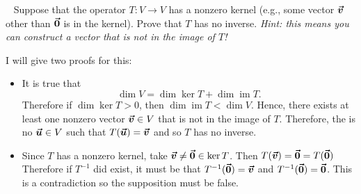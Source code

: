 \documentclass[12pt]{article} %
\newcommand{\image}{\operatorname{im}}
\begin{document}
\newpage
\begin{problem}~
    Suppose that the operator $T\colon V \to V$ has a nonzero kernel (e.g., some vector $\boldsymbol{\vec{v}}$ other than $\boldsymbol{\vec{0}}$ is in the kernel). Prove that $T$ has no inverse. \emph{Hint: this means you can construct a vector that is not in the image of $T$!}
\end{problem}
\begin{solution}
I will give two proofs for this:
\begin{itemize}
\item It is true that
\[
\dim V = \dim \ker T + \dim \image T.
\]
Therefore if $\dim \ker T >0$, then $\dim \image T < \dim V$. Hence, there exists at least one nonzero vector $\boldsymbol{\vec{v}} \in V$ that is not in the image of $T$. Therefore, the is no $\boldsymbol{\vec{u}} \in V$ such that $T(\boldsymbol{\vec{u}})=\boldsymbol{\vec{v}}$ and so $T$ has no inverse.
\item Since $T$ has a nonzero kernel, take $\boldsymbol{\vec{v}} \neq \boldsymbol{\vec{0}} \in \ker T$. Then $T(\boldsymbol{\vec{v}}) = \boldsymbol{\vec{0}} = T(\boldsymbol{\vec{0}})$ Therefore if $T^{-1}$ did exist, it must be that $T^{-1}(\boldsymbol{\vec{0}}) = \boldsymbol{\vec{v}}$ and $T^{-1}(\boldsymbol{\vec{0}}) = \boldsymbol{\vec{0}}$. This is a contradiction so the supposition must be false.
\end{itemize}
\end{solution}
\end{document}
